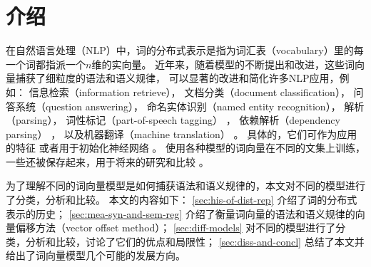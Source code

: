 \section{介绍}
在自然语言处理（NLP）中，词的分布式表示是指为词汇表（vocabulary）里的每一个词都指派一个$n$维的实向量。
近年来，随着模型的不断提出和改进，这些词向量捕获了细粒度的语法和语义规律，
可以显著的改进和简化许多NLP应用，例如：
信息检索（information retrieve）\cite{DBLP:books/daglib/0021593}，
文档分类（document classification）\cite{Sebastiani:2002:MLA:505282.505283}，
问答系统（question answering）\cite{DBLP:conf/sigir/TellexKLFM03}，
命名实体识别（named entity recognition）\cite{DBLP:journals/jmlr/CollobertWBKKK11}，
解析（parsing）\cite{DBLP:conf/icml/SocherLNM11}，
词性标记（part-of-speech tagging） \cite{DBLP:journals/jmlr/CollobertWBKKK11}，
依赖解析（dependency parsing）\cite{DBLP:conf/emnlp/ChenM14} \cite{DBLP:conf/emnlp/KongSSBDS14}，
以及机器翻译（machine translation）
\cite{DBLP:conf/acl/LiuYLZ14}
\cite{DBLP:conf/emnlp/KalchbrennerB13}
\cite{DBLP:conf/acl/DevlinZHLSM14}
\cite{DBLP:conf/nips/SutskeverVL14}。
具体的，它们可作为应用的特征\cite{DBLP:conf/acl/TurianRB10} 或者用于初始化神经网络
\cite{NIPS2012_4610}
\cite{DBLP:journals/jmlr/ErhanBCMVB10}
\cite{DBLP:conf/emnlp/GuoCWL14}。
使用各种模型的词向量在不同的文集上训练，一些还被保存起来，用于将来的研究和比较
\cite{DBLP:journals/corr/abs-1301-3781}。

为了理解不同的词向量模型是如何捕获语法和语义规律的，本文对不同的模型进行了分类，分析和比较。
本文的内容如下：
\cref{sec:his-of-dist-rep} 介绍了词的分布式表示的历史；
\cref{sec:mea-syn-and-sem-reg} 介绍了衡量词向量的语法和语义规律的向量偏移方法（vector offset method）；
\cref{sec:diff-models} 对不同的模型进行了分类，分析和比较，讨论了它们的优点和局限性；
\cref{sec:diss-and-concl} 总结了本文并给出了词向量模型几个可能的发展方向。
